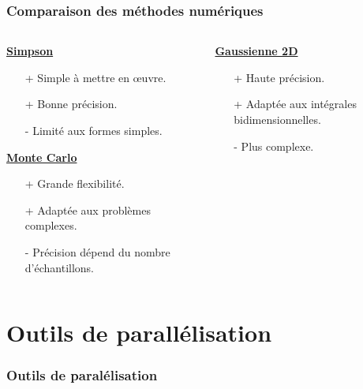 \documentclass[10pt]{beamer}
\begin{document}
\begin{frame}
    \frametitle{Comparaison des méthodes numériques}

    \begin{columns}[T] %
        \begin{column}{.45\textwidth}
            \underline{\textbf{Simpson}}
            \begin{itemize}
                \item[+] Simple à mettre en œuvre.
                \item[+] Bonne précision.
                \item[-] Limité aux formes simples.
            \end{itemize}
            \vspace{10pt}
            \underline{\textbf{Monte Carlo}}
            \begin{itemize}
                \item[+] Grande flexibilité.
                \item[+] Adaptée aux problèmes complexes.
                \item[-] Précision dépend du nombre d'échantillons.
            \end{itemize}
        \end{column}
        \begin{column}{.45\textwidth}
            \underline{\textbf{Gaussienne 2D}}
            \begin{itemize}
                \item[+] Haute précision.
                \item[+] Adaptée aux intégrales bidimensionnelles.
                \item[-] Plus complexe.
            \end{itemize}
        \end{column}
    \end{columns}

\end{frame}
    



\section{Outils de parallélisation}

\begin{frame}
    \frametitle{Outils de paralélisation}
    \tableofcontents[currentsection]
\end{frame}
\end{document}
